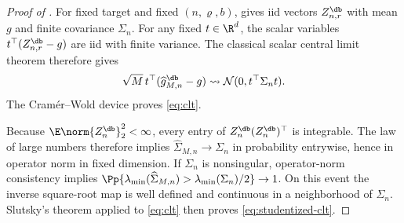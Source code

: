 \begin{proof}[Proof of ]
For fixed target and fixed $(n,\varrho,b)$,  gives iid vectors $Z_{n,r}^{\db}$ with mean $g$ and finite covariance $\Sigma_n$.  For any fixed $t\in\R^d$, the scalar variables
$t^\top(Z_{n,r}^{\db}-g)$ are iid with finite variance.  The classical scalar central limit theorem therefore gives
\[
 \sqrt M\,t^\top(\widehat g_{M,n}^{\db}-g)
 \rightsquigarrow \mathcal N(0,t^\top\Sigma_nt).
\]
The Cram\'er--Wold device proves \eqref{eq:clt}.

Because $\E\norm{Z_n^{\db}}_2^2<\infty$, every entry of $Z_n^{\db}(Z_n^{\db})^\top$ is integrable.  The law of large numbers therefore implies
$\widehat\Sigma_{M,n}\to\Sigma_n$ in probability entrywise, hence in operator norm in fixed dimension.  If $\Sigma_n$ is nonsingular, operator-norm consistency implies
$\Pp\{\lambda_{\min}(\widehat\Sigma_{M,n})>\lambda_{\min}(\Sigma_n)/2\}\to1$.
On this event the inverse square-root map is well defined and continuous in a neighborhood of $\Sigma_n$.  Slutsky's theorem applied to \eqref{eq:clt} then proves \eqref{eq:studentized-clt}.
\end{proof}
